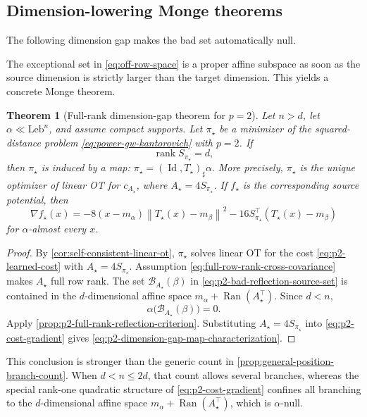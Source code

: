 \documentclass[11pt,a4paper]{article}
\newtheorem{theorem}{Theorem}[section]
\theoremstyle{definition}
\theoremstyle{remark}
\newcommand{\Id}{\operatorname{Id}}
\newcommand{\rank}{\operatorname{rank}}
\newcommand{\Ran}{\operatorname{Ran}}
\newcommand{\norm}[1]{\left\lVert #1\right\rVert}
\begin{document}
\subsection{Dimension-lowering Monge theorems}

The following dimension gap makes the bad set automatically null.

The exceptional set in \eqref{eq:off-row-space} is a proper affine subspace
as soon as the source dimension is strictly larger than the target dimension.
This yields a concrete Monge theorem.

\begin{theorem}[Full-rank dimension-gap theorem for \(p=2\)]
\label{thm:p2-dimension-gap-monge}
Let \(n>d\), let \(\alpha\ll\mathrm{Leb}^n\), and assume compact supports.
Let \(\pi_\star\) be a minimizer of the squared-distance problem
\eqref{eq:power-gw-kantorovich} with \(p=2\).  If
\begin{equation}
  \rank S_{\pi_\star}=d,
  \label{eq:full-row-rank-cross-covariance}
\end{equation}
then \(\pi_\star\) is induced by a map:
\(
 \pi_\star=(\Id,T_\star)_\sharp\alpha.
\)
More precisely, \(\pi_\star\) is the unique optimizer of linear OT for
\(c_{A_\star}\), where \(A_\star=4S_{\pi_\star}\).  If \(f_\star\) is the
corresponding source potential, then
\begin{equation}
  \nabla f_\star(x)
  =-8(x-m_\alpha)\norm{T_\star(x)-m_\beta}^2
   -16S_{\pi_\star}^\top(T_\star(x)-m_\beta)
  \label{eq:p2-dimension-gap-map-characterization}
\end{equation}
for \(\alpha\)-almost every \(x\).
\end{theorem}

\begin{proof}
By \cref{cor:self-consistent-linear-ot}, \(\pi_\star\) solves linear OT for
the cost \eqref{eq:p2-learned-cost} with
\(A_\star=4S_{\pi_\star}\).  Assumption
\eqref{eq:full-row-rank-cross-covariance} makes \(A_\star\) full row rank.
The set \(\mathcal B_{A_\star}(\beta)\) in
\eqref{eq:p2-bad-reflection-source-set} is contained in the
\(d\)-dimensional affine space \(m_\alpha+\Ran(A_\star^\top)\).  Since
\(d<n\),
\[
  \alpha\bigl(\mathcal B_{A_\star}(\beta)\bigr)=0.
\]
Apply \cref{prop:p2-full-rank-reflection-criterion}.  Substituting
\(A_\star=4S_{\pi_\star}\) into \eqref{eq:p2-cost-gradient} gives
\eqref{eq:p2-dimension-gap-map-characterization}.
\end{proof}

This conclusion is stronger than the generic count in
\cref{prop:general-position-branch-count}.  When \(d<n\leq2d\), that count
allows several branches, whereas the special rank-one quadratic structure of
\eqref{eq:p2-cost-gradient} confines all branching to the \(d\)-dimensional
affine space \(m_\alpha+\Ran(A_\star^\top)\), which is \(\alpha\)-null.
\end{document}
